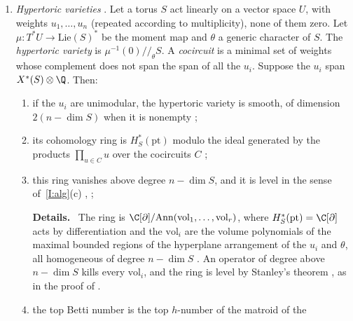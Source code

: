 \documentclass[11pt]{amsart}
\newenvironment{details}{\par\color{black!60!green}\noindent\textbf{Details.}\ }{\par}
\begin{document}
\begin{enumerate}[leftmargin=2.6em,label=(I\arabic*)]
A point of $T^*N$ is $\nu_{\det}$-semistable if and only if the images of the
$W_i$ generate $V=\bigoplus_iV_i$ under the arrows of the doubled quiver.
Loops are allowed.
\begin{details}
$\nu_{\det}\cdot\bb>0$ for $\bb\neq0$, so a subrepresentation of
dimension $(\bb,0)$ never destabilizes, and one of dimension $(\bb,1)$, which
contains the images of the $W_i$, destabilizes unless $\bb=\bv$.
\end{details}
\item\label{I:hypertoric} \emph{Hypertoric varieties}
\cite{hauselToricHyperKahler2002}.  Let a torus $S$ act linearly on a vector space $U$,
with weights $u_1,\dots,u_n$ (repeated according to multiplicity), none of them
zero.  Let $\mu\colon T^*U\to\mathrm{Lie}(S)^*$ be the moment map and $\theta$ a
generic character of $S$.  The \emph{hypertoric variety} is
$\mu^{-1}(0)/\!\!/_\theta S$.  A \emph{cocircuit} is a minimal set of weights
whose complement does not span the span of all the $u_i$.  Suppose the $u_i$
span $X^*(S)\otimes\Q$.  Then:
\begin{enumerate}[label=(\alph*)]
\item if the $u_i$ are unimodular, the hypertoric variety is smooth, of
dimension $2(n-\dim S)$ when it is nonempty \cite{hauselToricHyperKahler2002};
\item its cohomology ring is $H^*_S(\mathrm{pt})$ modulo the ideal generated by
the products $\prod_{u\in C}u$ over the cocircuits $C$
\cite[Thm.~1.1]{hauselToricHyperKahler2002};
\item this ring vanishes above degree $n-\dim S$, and it is level in the
sense of~\ref{I:alg}(c) \cite[Thm.~7.1, Prop.~6.7]{hauselToricHyperKahler2002},
\cite[Thm.~III.3.4]{stanleyCombinatoricsCommutative1983};
\begin{details}
The ring is $\C[\partial]/\mathrm{Ann}(\mathrm{vol}_1,\dots,\mathrm{vol}_r)$,
where $H^*_S(\mathrm{pt})=\C[\partial]$ acts by differentiation and the $\mathrm{vol}_i$ are
the volume polynomials of the maximal bounded regions of the hyperplane
arrangement of the $u_i$ and $\theta$, all homogeneous of degree $n-\dim S$
\cite[Thm.~7.1, Prop.~6.7]{hauselToricHyperKahler2002}.  An operator of degree above
$n-\dim S$ kills every $\mathrm{vol}_i$, and the ring is level by Stanley's theorem
\cite[Thm.~III.3.4]{stanleyCombinatoricsCommutative1983}, as in the proof of
\cite[Thm.~7.1]{hauselToricHyperKahler2002}.
\end{details}
\item the top Betti number is the top $h$-number of the matroid of the

\end{enumerate}
\end{enumerate}
\end{document}

